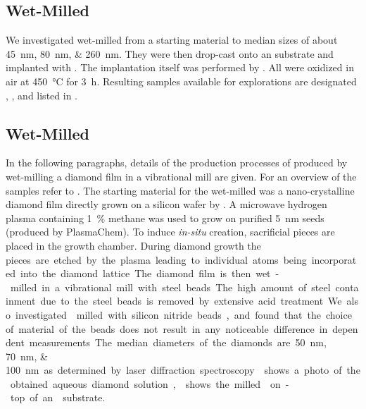 	\subsection{Wet-Milled \HPHT \Nds}\label{subsec::milled_hpht_nds}
		We investigated \nds wet-milled from a \HPHT starting material to median sizes of about \SIlist{45;80;260}{nm}.
		They were then drop-cast onto an \ir substrate and implanted with  . The implantation itself was performed by \rogalla.
		All \HPHT \nds were oxidized in air at \SI{450}{\celsius} for \SI{3}{\hour}. Resulting samples available for explorations are designated \hphtimpfortyfive, \hphtimpeighty, \hphtimptwosixty and listed in .

	\subsection{Wet-Milled \CVD \Nds}\label{subsec::milled_nds}

		In the following paragraphs, details of the production processes of \nd produced by wet-milling a \CVD diamond film in a vibrational mill are given.
		For an overview of the samples refer to .
		The starting material for the wet-milled \nds was a nano-crystalline diamond film \cite{Williams2006a} directly grown on a silicon wafer by \CVD.
		A microwave hydrogen plasma containing \SI{1}{\percent} methane was used to grow on purified \SI{5}{\nano\meter} \nd seeds (produced by PlasmaChem).
		To induce \textit{in-situ} \siv creation, sacrificial \Si pieces are placed in the growth chamber.
		During diamond growth the \si pieces are etched by the plasma leading to individual atoms being incorporated into the diamond lattice.
		The diamond film is then wet-milled in a vibrational mill with steel beads.
		The high amount of steel containment due to the steel beads is removed by extensive acid treatment.
		We also investigated \nds milled with silicon nitride beads, and found that the choice of material of the beads does not result in any noticeable difference in dependent measurements.
		The median diameters of the diamonds are \SIlist{50; 70; 100}{\nano\meter} as determined by laser diffraction spectroscopy. 
		 shows a photo of the obtained aqueous diamond solution,  shows the milled \nds on-top of an \ir substrate.

